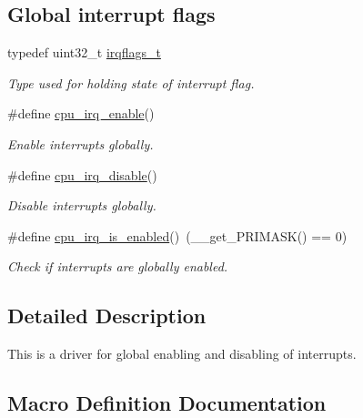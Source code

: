 \subsection*{Global interrupt flags}
\begin{DoxyCompactItemize}
\item 
typedef uint32\+\_\+t \mbox{\hyperlink{group__interrupt__group_ga9aa1f52defc97531b6343233abeea613}{irqflags\+\_\+t}}
\begin{DoxyCompactList}\small\item\em Type used for holding state of interrupt flag. \end{DoxyCompactList}\item 
\#define \mbox{\hyperlink{group__interrupt__group_gae4922a4bd8ba4150211fbc7f2302403c}{cpu\+\_\+irq\+\_\+enable}}()
\begin{DoxyCompactList}\small\item\em Enable interrupts globally. \end{DoxyCompactList}\item 
\#define \mbox{\hyperlink{group__interrupt__group_ga7b77391ed86e2e027f9ee1dd99a06980}{cpu\+\_\+irq\+\_\+disable}}()
\begin{DoxyCompactList}\small\item\em Disable interrupts globally. \end{DoxyCompactList}\item 
\#define \mbox{\hyperlink{group__interrupt__group_gae1545a2473614564550b9c4015c94978}{cpu\+\_\+irq\+\_\+is\+\_\+enabled}}()~(\+\_\+\+\_\+get\+\_\+\+P\+R\+I\+M\+A\+SK() == 0)
\begin{DoxyCompactList}\small\item\em Check if interrupts are globally enabled. \end{DoxyCompactList}\end{DoxyCompactItemize}


\subsection{Detailed Description}
This is a driver for global enabling and disabling of interrupts. 

\subsection{Macro Definition Documentation}
\mbox{\label{group__interrupt__group_ga7b77391ed86e2e027f9ee1dd99a06980}} 
